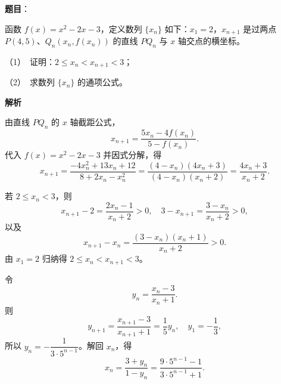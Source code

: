 \begin{answer}

\textbf{题目}：

函数 $f(x)=x^2-2x-3$，定义数列 $\{x_n\}$ 如下：\linebreak $x_1=2$，$x_{n+1}$ 是过两点 $P(4,5)\text{、}Q_n(x_n,f(x_n))$ 的直线 $PQ_n$ 与 $x$ 轴交点的横坐标。

（1）　证明：$2\leqslant x_n<x_{n+1}<3$；

（2）　求数列 $\{x_n\}$ 的通项公式。

\textbf{解析}

由直线 $PQ_n$ 的 $x$ 轴截距公式，
\nopagebreak[4]
\[
x_{n+1}=\frac{5x_n-4f(x_n)}{5-f(x_n)}.
\]
代入 $f(x)=x^2-2x-3$ 并因式分解，得
\nopagebreak[4]
\[
x_{n+1}=\frac{-4x_n^2+13x_n+12}{8+2x_n-x_n^2}
=\frac{(4-x_n)(4x_n+3)}{(4-x_n)(x_n+2)}
=\frac{4x_n+3}{x_n+2}.
\]


若 $2\leqslant x_n<3$，则
\nopagebreak[4]
\[
x_{n+1}-2=\frac{2x_n-1}{x_n+2}>0,
\quad
3-x_{n+1}=\frac{3-x_n}{x_n+2}>0,
\]
以及
\nopagebreak[4]
\[
x_{n+1}-x_n=\frac{(3-x_n)(x_n+1)}{x_n+2}>0.
\]
由 $x_1=2$ 归纳得 $2\leqslant x_n<x_{n+1}<3$。


令
\nopagebreak[4]
\[
y_n=\frac{x_n-3}{x_n+1}.
\]
则
\nopagebreak[4]
\[
y_{n+1}=\frac{x_{n+1}-3}{x_{n+1}+1}=\frac15y_n,
\quad y_1=-\frac13,
\]
所以 $y_n=-\dfrac1{3\cdot5^{n-1}}$。解回 $x_n$，得
\nopagebreak[4]
\[
x_n=\frac{3+y_n}{1-y_n}
=\frac{9\cdot5^{n-1}-1}{3\cdot5^{n-1}+1}.
\]



\end{answer}